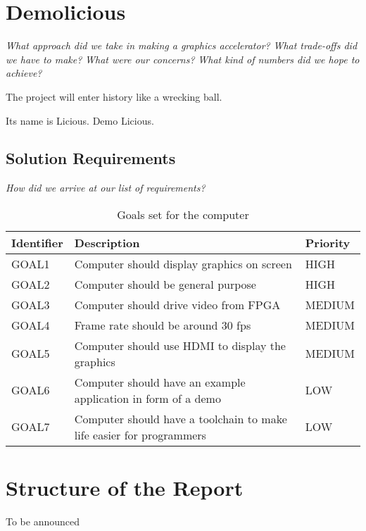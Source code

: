 \documentclass[../main/report.tex]{subfiles}
\begin{document}
\section{Demolicious}

\textit{What approach did we take in making a graphics accelerator?}
\textit{What trade-offs did we have to make?}
\textit{What were our concerns?}
\textit{What kind of numbers did we hope to achieve?}

The project will enter history like a wrecking ball.

Its name is Licious. Demo Licious.

\subsection{Solution Requirements}

\textit{How did we arrive at our list of requirements?}

\begin{table}[htp]
    \centering
    \begin{tabular}{|l|p{8cm}|l|}
        \hline
        \textbf{Identifier}           & \textbf{Description}                & \textbf{Priority} \\ \hline
        GOAL1  & Computer should display graphics on screen                           & HIGH    \\ \hline
        GOAL2  & Computer should be general purpose                                   & HIGH    \\ \hline
        GOAL3  & Computer should drive video from FPGA                                & MEDIUM  \\ \hline
        GOAL4  & Frame rate should be around 30 fps                                   & MEDIUM  \\ \hline
        GOAL5  & Computer should use HDMI to display the graphics                     & MEDIUM  \\ \hline
        GOAL6  & Computer should have an example application in form of a demo        & LOW     \\ \hline
        GOAL7  & Computer should have a toolchain to make life easier for programmers & LOW     \\ \hline
    \end{tabular}
    \caption{Goals set for the computer}
    \label{tab:goals}
\end{table}

\newpage
\section{Structure of the Report}

To be announced
\end{document}
